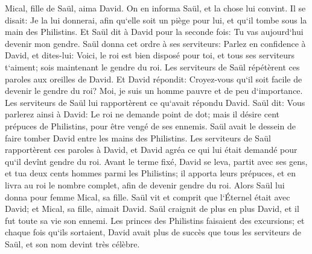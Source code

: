 \verse Mical, fille de Saül, aima David. On en informa Saül, et la chose lui convint. 
\verse Il se disait: Je la lui donnerai, afin qu`elle soit un piège pour lui, et qu`il tombe sous la main des Philistins. Et Saül dit à David pour la seconde fois: Tu vas aujourd`hui devenir mon gendre. 
\verse Saül donna cet ordre à ses serviteurs: Parlez en confidence à David, et dites-lui: Voici, le roi est bien disposé pour toi, et tous ses serviteurs t`aiment; sois maintenant le gendre du roi. 
\verse Les serviteurs de Saül répétèrent ces paroles aux oreilles de David. Et David répondit: Croyez-vous qu`il soit facile de devenir le gendre du roi? Moi, je suis un homme pauvre et de peu d`importance. 
\verse Les serviteurs de Saül lui rapportèrent ce qu`avait répondu David. 
\verse Saül dit: Vous parlerez ainsi à David: Le roi ne demande point de dot; mais il désire cent prépuces de Philistins, pour être vengé de ses ennemis. Saül avait le dessein de faire tomber David entre les mains des Philistins. 
\verse Les serviteurs de Saül rapportèrent ces paroles à David, et David agréa ce qui lui était demandé pour qu`il devînt gendre du roi. 
\verse Avant le terme fixé, David se leva, partit avec ses gens, et tua deux cents hommes parmi les Philistins; il apporta leurs prépuces, et en livra au roi le nombre complet, afin de devenir gendre du roi. Alors Saül lui donna pour femme Mical, sa fille. 
\verse Saül vit et comprit que l`Éternel était avec David; et Mical, sa fille, aimait David. 
\verse Saül craignit de plus en plus David, et il fut toute sa vie son ennemi. 
\verse Les princes des Philistins faisaient des excursions; et chaque fois qu`ils sortaient, David avait plus de succès que tous les serviteurs de Saül, et son nom devint très célèbre. 

\chapter{}

